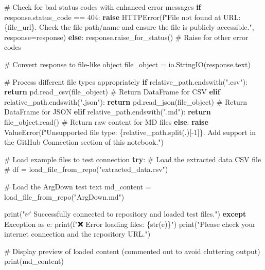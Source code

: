 \documentclass[
  11pt,
  letterpaper,
]{book}
\newenvironment{Shaded}{\begin{snugshade}}{\end{snugshade}}
\newcommand{\BuiltInTok}[1]{\textcolor[rgb]{0.00,0.23,0.31}{#1}}
\newcommand{\CommentTok}[1]{\textcolor[rgb]{0.37,0.37,0.37}{#1}}
\newcommand{\ControlFlowTok}[1]{\textcolor[rgb]{0.00,0.23,0.31}{\textbf{#1}}}
\newcommand{\DecValTok}[1]{\textcolor[rgb]{0.68,0.00,0.00}{#1}}
\newcommand{\ImportTok}[1]{\textcolor[rgb]{0.00,0.46,0.62}{#1}}
\newcommand{\NormalTok}[1]{\textcolor[rgb]{0.00,0.23,0.31}{#1}}
\newcommand{\OperatorTok}[1]{\textcolor[rgb]{0.37,0.37,0.37}{#1}}
\newcommand{\PreprocessorTok}[1]{\textcolor[rgb]{0.68,0.00,0.00}{#1}}
\newcommand{\SpecialCharTok}[1]{\textcolor[rgb]{0.37,0.37,0.37}{#1}}
\newcommand{\SpecialStringTok}[1]{\textcolor[rgb]{0.13,0.47,0.30}{#1}}
\newcommand{\StringTok}[1]{\textcolor[rgb]{0.13,0.47,0.30}{#1}}
\begin{document}
\begin{Shaded}
\begin{Highlighting}[]
    \CommentTok{\# Check for bad status codes with enhanced error messages}
    \ControlFlowTok{if}\NormalTok{ response.status\_code }\OperatorTok{==} \DecValTok{404}\NormalTok{:}
        \ControlFlowTok{raise}\NormalTok{ HTTPError(}\SpecialStringTok{f"File not found at URL: }\SpecialCharTok{\{}\NormalTok{file\_url}\SpecialCharTok{\}}\SpecialStringTok{. Check the file path/name and ensure the file is publicly accessible."}\NormalTok{, response}\OperatorTok{=}\NormalTok{response)}
    \ControlFlowTok{else}\NormalTok{:}
\NormalTok{        response.raise\_for\_status()  }\CommentTok{\# Raise for other error codes}

    \CommentTok{\# Convert response to file{-}like object}
\NormalTok{    file\_object }\OperatorTok{=}\NormalTok{ io.StringIO(response.text)}

    \CommentTok{\# Process different file types appropriately}
    \ControlFlowTok{if}\NormalTok{ relative\_path.endswith(}\StringTok{".csv"}\NormalTok{):}
        \ControlFlowTok{return}\NormalTok{ pd.read\_csv(file\_object)  }\CommentTok{\# Return DataFrame for CSV}
    \ControlFlowTok{elif}\NormalTok{ relative\_path.endswith(}\StringTok{".json"}\NormalTok{):}
        \ControlFlowTok{return}\NormalTok{ pd.read\_json(file\_object)  }\CommentTok{\# Return DataFrame for JSON}
    \ControlFlowTok{elif}\NormalTok{ relative\_path.endswith(}\StringTok{".md"}\NormalTok{):}
        \ControlFlowTok{return}\NormalTok{ file\_object.read()  }\CommentTok{\# Return raw content for MD files}
    \ControlFlowTok{else}\NormalTok{:}
        \ControlFlowTok{raise} \PreprocessorTok{ValueError}\NormalTok{(}\SpecialStringTok{f"Unsupported file type: }\SpecialCharTok{\{}\NormalTok{relative\_path}\SpecialCharTok{.}\NormalTok{split(}\StringTok{\textquotesingle{}.\textquotesingle{}}\NormalTok{)[}\OperatorTok{{-}}\DecValTok{1}\NormalTok{]}\SpecialCharTok{\}}\SpecialStringTok{. Add support in the GitHub Connection section of this notebook."}\NormalTok{)}

\CommentTok{\# Load example files to test connection}
\ControlFlowTok{try}\NormalTok{:}
    \CommentTok{\# Load the extracted data CSV file}
\CommentTok{\#    df = load\_file\_from\_repo("extracted\_data.csv")}

    \CommentTok{\# Load the ArgDown test text}
\NormalTok{    md\_content }\OperatorTok{=}\NormalTok{ load\_file\_from\_repo(}\StringTok{"ArgDown.md"}\NormalTok{)}

    \BuiltInTok{print}\NormalTok{(}\StringTok{"✅ Successfully connected to repository and loaded test files."}\NormalTok{)}
\ControlFlowTok{except} \PreprocessorTok{Exception} \ImportTok{as}\NormalTok{ e:}
    \BuiltInTok{print}\NormalTok{(}\SpecialStringTok{f"❌ Error loading files: }\SpecialCharTok{\{}\BuiltInTok{str}\NormalTok{(e)}\SpecialCharTok{\}}\SpecialStringTok{"}\NormalTok{)}
    \BuiltInTok{print}\NormalTok{(}\StringTok{"Please check your internet connection and the repository URL."}\NormalTok{)}

\CommentTok{\# Display preview of loaded content (commented out to avoid cluttering output)}
\BuiltInTok{print}\NormalTok{(md\_content)}
\end{Highlighting}
\end{Shaded}
\end{document}
